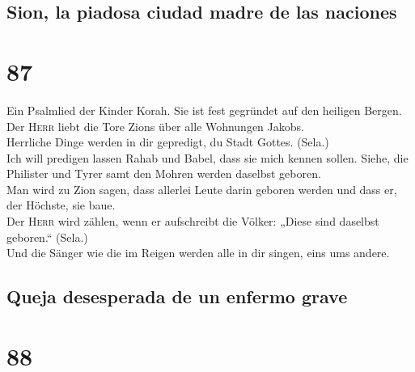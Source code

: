 \hypertarget{sion-la-piadosa-ciudad-madre-de-las-naciones}{%
\subsection{Sion, la piadosa ciudad madre de las
naciones}\label{sion-la-piadosa-ciudad-madre-de-las-naciones}}

\hypertarget{section-86}{%
\section{87}\label{section-86}}

 Ein Psalmlied der Kinder Korah. Sie ist fest gegründet
auf den heiligen Bergen.\\
 Der \textsc{Herr} liebt die Tore Zions über alle
Wohnungen Jakobs.\\
 Herrliche Dinge werden in dir gepredigt, du Stadt Gottes.
(Sela.)\\
 Ich will predigen lassen Rahab und Babel, dass sie mich
kennen sollen. Siehe, die Philister und Tyrer samt den Mohren werden
daselbst geboren.\\
 Man wird zu Zion sagen, dass allerlei Leute darin geboren
werden und dass er, der Höchste, sie baue.\\
 Der \textsc{Herr} wird zählen, wenn er aufschreibt die
Völker: „Diese sind daselbst geboren.`` (Sela.)\\
 Und die Sänger wie die im Reigen werden alle in dir
singen, eins ums andere.

\hypertarget{queja-desesperada-de-un-enfermo-grave}{%
\subsection{Queja desesperada de un enfermo
grave}\label{queja-desesperada-de-un-enfermo-grave}}

\hypertarget{section-87}{%
\section{88}\label{section-87}}

